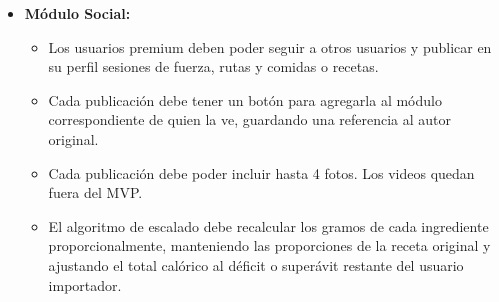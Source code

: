 \begin{itemize}
    \begin{itemize}
        \item El motor debe calcular diariamente la carga aguda (ATL, constante de 7 días) y crónica (CTL, constante de 42 días) del atleta, utilizando un modelo de media móvil exponencial ponderada, según las definiciones de la Tabla \ref{tab:def_operativas}.
        \item Para poder comparar la fuerza y el cardio, todas las sesiones deben tener una carga en una misma escala, basada en el RPE de la sesión multiplicado por sus minutos.
        \item Las alertas de fatiga cruzada deben generarse cuando el índice de fatiga cruzada (la razón ATL/CTL de la carga total) supere un umbral configurable, que parte en 1,3, y el plan semanal sugerido indique una sesión de la disciplina opuesta en las próximas 24 horas. El índice solo se muestra con al menos 28 días de historial.
        \item Si entre una sesión de fuerza y una de cardio hay menos de 6 horas, el sistema debe avisar al usuario y sugerirle separarlas.
        \item Si en días seguidos se repiten sesiones de fuerza y de cardio con poca recuperación entre ellas, el sistema debe sugerir reorganizar el calendario.
        \item El sistema debe revisar si las comidas se hicieron en los momentos recomendados, como carbohidratos 2 a 3 horas antes del cardio y proteínas dentro de las 2 horas posteriores a la fuerza, y mostrar una sugerencia cuando no sea así.
        \item Si en los últimos días el usuario comió bastante menos de lo que gastó, la alerta debe mencionarlo como un factor que puede retrasar su recuperación.
    \end{itemize}
    \item \textbf{Módulo Social:}
    \begin{itemize}
        \item Los usuarios premium deben poder seguir a otros usuarios y publicar en su perfil sesiones de fuerza, rutas y comidas o recetas.
        \item Cada publicación debe tener un botón para agregarla al módulo correspondiente de quien la ve, guardando una referencia al autor original.
        \item Cada publicación debe poder incluir hasta 4 fotos. Los videos quedan fuera del MVP.
        \item El algoritmo de escalado debe recalcular los gramos de cada ingrediente proporcionalmente, manteniendo las proporciones de la receta original y ajustando el total calórico al déficit o superávit restante del usuario importador.

\end{itemize}
\end{itemize}
